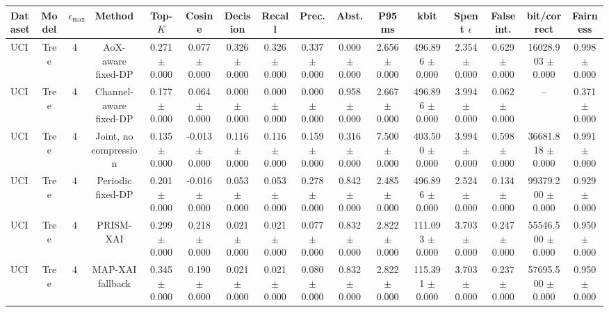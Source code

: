 \begin{tabular}{lccccccccccccccc}
\toprule
Dataset & Model & $\epsilon_{\max}$ & Method & Top-$K$ & Cosine & Decision & Recall & Prec. & Abst. & P95 ms & kbit & Spent $\epsilon$ & False int. & bit/correct & Fairness \\
\midrule
UCI & Tree & 4 & AoX-aware fixed-DP & 0.271 $\pm$ 0.000 & 0.077 $\pm$ 0.000 & 0.326 $\pm$ 0.000 & 0.326 $\pm$ 0.000 & 0.337 $\pm$ 0.000 & 0.000 $\pm$ 0.000 & 2.656 $\pm$ 0.000 & 496.896 $\pm$ 0.000 & 2.354 $\pm$ 0.000 & 0.629 $\pm$ 0.000 & 16028.903 $\pm$ 0.000 & 0.998 $\pm$ 0.000 \\
UCI & Tree & 4 & Channel-aware fixed-DP & 0.177 $\pm$ 0.000 & 0.064 $\pm$ 0.000 & 0.000 $\pm$ 0.000 & 0.000 $\pm$ 0.000 & 0.000 $\pm$ 0.000 & 0.958 $\pm$ 0.000 & 2.667 $\pm$ 0.000 & 496.896 $\pm$ 0.000 & 3.994 $\pm$ 0.000 & 0.062 $\pm$ 0.000 & -- & 0.371 $\pm$ 0.000 \\
UCI & Tree & 4 & Joint, no compression & 0.135 $\pm$ 0.000 & -0.013 $\pm$ 0.000 & 0.116 $\pm$ 0.000 & 0.116 $\pm$ 0.000 & 0.159 $\pm$ 0.000 & 0.316 $\pm$ 0.000 & 7.500 $\pm$ 0.000 & 403.500 $\pm$ 0.000 & 3.994 $\pm$ 0.000 & 0.598 $\pm$ 0.000 & 36681.818 $\pm$ 0.000 & 0.991 $\pm$ 0.000 \\
UCI & Tree & 4 & Periodic fixed-DP & 0.201 $\pm$ 0.000 & -0.016 $\pm$ 0.000 & 0.053 $\pm$ 0.000 & 0.053 $\pm$ 0.000 & 0.278 $\pm$ 0.000 & 0.842 $\pm$ 0.000 & 2.485 $\pm$ 0.000 & 496.896 $\pm$ 0.000 & 2.524 $\pm$ 0.000 & 0.134 $\pm$ 0.000 & 99379.200 $\pm$ 0.000 & 0.929 $\pm$ 0.000 \\
UCI & Tree & 4 & PRISM-XAI & 0.299 $\pm$ 0.000 & 0.218 $\pm$ 0.000 & 0.021 $\pm$ 0.000 & 0.021 $\pm$ 0.000 & 0.077 $\pm$ 0.000 & 0.832 $\pm$ 0.000 & 2.822 $\pm$ 0.000 & 111.093 $\pm$ 0.000 & 3.703 $\pm$ 0.000 & 0.247 $\pm$ 0.000 & 55546.500 $\pm$ 0.000 & 0.950 $\pm$ 0.000 \\
UCI & Tree & 4 & MAP-XAI fallback & 0.345 $\pm$ 0.000 & 0.190 $\pm$ 0.000 & 0.021 $\pm$ 0.000 & 0.021 $\pm$ 0.000 & 0.080 $\pm$ 0.000 & 0.832 $\pm$ 0.000 & 2.822 $\pm$ 0.000 & 115.391 $\pm$ 0.000 & 3.703 $\pm$ 0.000 & 0.237 $\pm$ 0.000 & 57695.500 $\pm$ 0.000 & 0.950 $\pm$ 0.000 \\
\bottomrule
\end{tabular}

